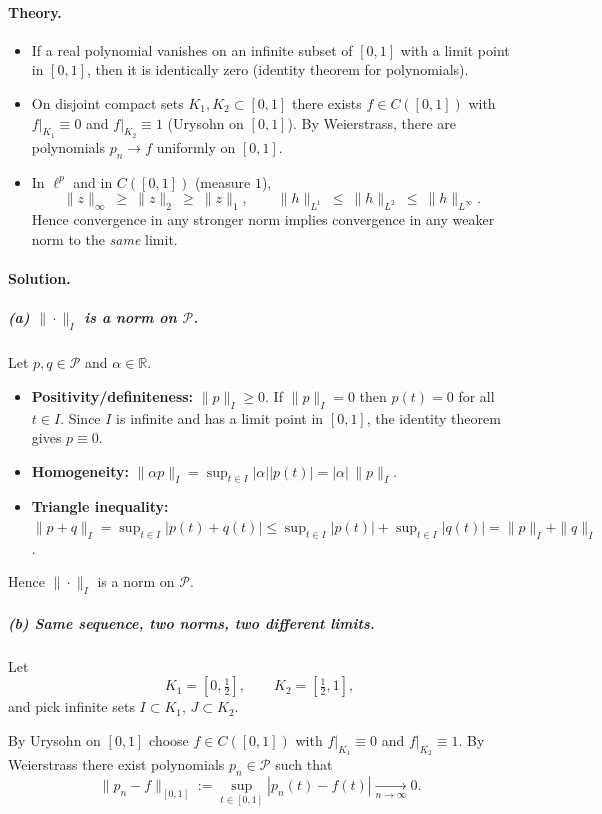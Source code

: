 \documentclass[12pt,a4paper]{article}
\theoremstyle{plain}
\theoremstyle{definition}
\theoremstyle{remark}
\theoremstyle{remark}
\begin{document}
\bigskip
\paragraph{Theory.}
\begin{itemize}
	\item If a real polynomial vanishes on an infinite subset of $[0,1]$ with a limit point in $[0,1]$,
	then it is identically zero (identity theorem for polynomials).
	\item On disjoint compact sets $K_1,K_2\subset[0,1]$ there exists $f\in C([0,1])$ with
	$f|_{K_1}\equiv0$ and $f|_{K_2}\equiv1$ (Urysohn on $[0,1]$).  
	By Weierstrass, there are polynomials $p_n\to f$ uniformly on $[0,1]$.
	\item In $\ell^p$ and in $C([0,1])$ (measure $1$),
	\[
	\|z\|_\infty \ \ge\ \|z\|_2 \ \ge\ \|z\|_1,
	\qquad
	\|h\|_{L^1}\ \le\ \|h\|_{L^2}\ \le\ \|h\|_{L^\infty}.
	\]
	Hence convergence in any stronger norm implies convergence in any weaker norm to the \emph{same} limit.
\end{itemize}

\bigskip
\paragraph{Solution.}

\subparagraph{(a) $\|\cdot\|_{I}$ is a norm on $\mathcal{P}$.}
Let $p,q\in\mathcal{P}$ and $\alpha\in\mathbb{R}$.
\begin{itemize}
	\item \textbf{Positivity/definiteness:} $\|p\|_{I}\ge0$.
	If $\|p\|_{I}=0$ then $p(t)=0$ for all $t\in I$.  
	Since $I$ is infinite and has a limit point in $[0,1]$, the identity theorem gives $p\equiv0$.
	\item \textbf{Homogeneity:} $\|\alpha p\|_{I}=\sup_{t\in I}|\alpha||p(t)|=|\alpha|\,\|p\|_{I}$.
	\item \textbf{Triangle inequality:}
	$\|p+q\|_{I}=\sup_{t\in I}|p(t)+q(t)|\le \sup_{t\in I}|p(t)|+\sup_{t\in I}|q(t)|=\|p\|_{I}+\|q\|_{I}$.
\end{itemize}
Hence $\|\cdot\|_{I}$ is a norm on $\mathcal{P}$.

\bigskip
\subparagraph{(b) Same sequence, two norms, two different limits.}
Let
\[
K_1=[0,\tfrac12],\qquad K_2=[\tfrac12,1],
\]
and pick infinite sets $I\subset K_1$, $J\subset K_2$.

By Urysohn on $[0,1]$ choose $f\in C([0,1])$ with $f|_{K_1}\equiv0$ and $f|_{K_2}\equiv1$.
By Weierstrass there exist polynomials $p_n\in\mathcal{P}$ such that
\[
\|p_n-f\|_{[0,1]}:=\sup_{t\in[0,1]}|p_n(t)-f(t)| \xrightarrow[n\to\infty]{} 0.
\]
\end{document}
